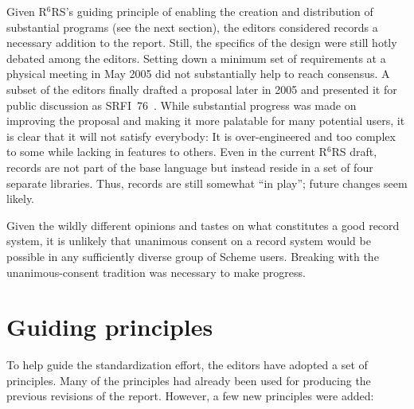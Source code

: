 \documentclass{sigplanconf}
\newcommand{\rn}[1]{R$^{#1}$RS}
\begin{document}
Given \rn{6}'s guiding principle of enabling the creation and
distribution of substantial programs (see the next section), the
editors considered records a necessary addition to the report.  Still,
the specifics of the design were still hotly debated among the
editors.  Setting down a minimum set of requirements at a physical
meeting in May 2005 did not substantially help to reach consensus.  A
subset of the editors finally drafted a proposal later in 2005 and
presented it for public discussion as SRFI~76~\cite{srfi76}.  While
substantial progress was made on improving the proposal and making it
more palatable for many potential users, it is clear that it will not
satisfy everybody: It is over-engineered and too complex to some while
lacking in features to others.  Even in the current \rn{6} draft,
records are not part of the base language but instead reside in a set
of four separate libraries.  Thus, records are still somewhat ``in
play''; future changes seem likely.

Given the wildly different opinions and tastes on what constitutes a
good record system, it is unlikely that unanimous consent on a record
system would be possible in any sufficiently diverse group of Scheme users.
Breaking with the unanimous-consent tradition was necessary to make
progress.

\section{Guiding principles}
\label{sec:principles}

To help guide the standardization effort, the editors have adopted a
set of principles.  Many of the principles had already been used for
producing the previous revisions of the report.  However, a few new
principles were added:
\end{document}
